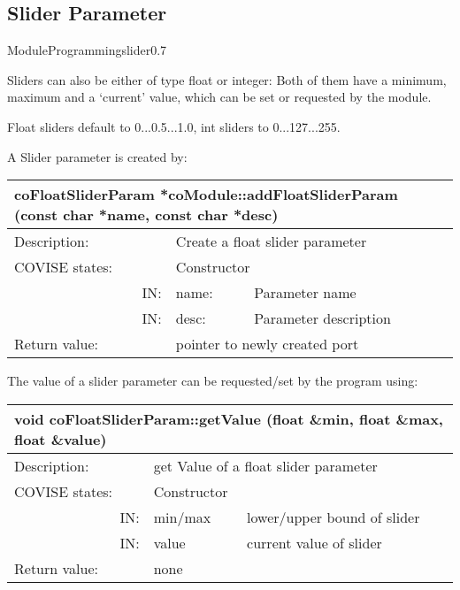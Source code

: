 \subsection{Slider Parameter}


\begin{covimgpath}{ModuleProgramming}{slider}{0.7} \end{covimgpath}

Sliders can also be either of type float or integer: Both of them have a minimum, maximum 
and a `current' value, which can be set or requested by the module.

Float sliders default to 0...0.5...1.0, int sliders to 0...127...255.

A Slider parameter is created by:

\begin{longtable}{|p{4cm}|p{2.5cm}|p{7cm}|}
\hline
\multicolumn{3}{|p{13.5cm}|}{\bf coFloatSliderParam *coModule::addFloatSliderParam 
(const char *name, const char *desc)} \\
\hline
{Description:}   
                        & \multicolumn{2}{|p{9.5cm}|}{Create a float slider parameter} \\
\hline
{COVISE states:} & \multicolumn{2}{|p{9.5cm}|}{Constructor} \\
\hline
\multicolumn{1}{|r|}{IN:} & {name:} 
                             & {Parameter name}\\
\hline
\multicolumn{1}{|r|}{IN:} & {desc:} 
                            & {Parameter description}\\
\hline
{Return value:}  
                        & \multicolumn{2}{|p{9.5cm}|}{pointer to newly created port} \endhead
\hline
\end{longtable}

The value of a slider parameter can be requested/set by the program using:

\begin{longtable}{|p{4cm}|p{2.5cm}|p{7cm}|}
\hline
\multicolumn{3}{|p{13.5cm}|}{\bf void coFloatSliderParam::getValue 
(float \&min, float \&max, float \&value)} \\
\hline
{Description:}   
                        & \multicolumn{2}{|p{9.5cm}|}{get Value of a float slider parameter} \\
\hline
{COVISE states:} & \multicolumn{2}{|p{9.5cm}|}{Constructor} \\
\hline
\multicolumn{1}{|r|}{IN:} & {min/max} 
                             & {lower/upper bound of slider}\\
\hline
\multicolumn{1}{|r|}{IN:} & {value} 
                            & {current value of slider}\\
\hline
{Return value:}  
                        & \multicolumn{2}{|p{9.5cm}|}{none} \endhead
\hline
\end{longtable}




